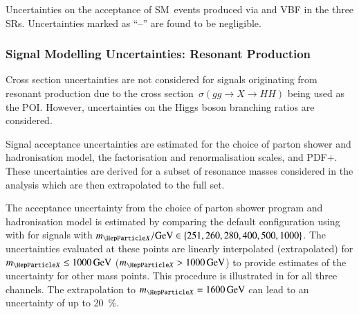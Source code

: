 \begin{table}[htbp]
  \centering

  \caption{Uncertainties on the acceptance of SM~\HH events produced via \ggF
    and VBF in the three SRs. Uncertainties marked as ``--'' are found to be
    negligible.}%
  \label{tab:theory_uncertainty_signal}

  
\end{table}


\subsubsection{Signal Modelling Uncertainties: Resonant \HH Production}

Cross section uncertainties are not considered for signals originating from
resonant \HH production due to the cross section~$\sigma(gg \to X \to HH)$ being
used as the POI. However, uncertainties on the Higgs boson branching ratios are
considered.

Signal acceptance uncertainties are estimated for the choice of parton shower
and hadronisation model, the factorisation and renormalisation scales, and
PDF+\alphas. These uncertainties are derived for a subset of resonance masses
considered in the analysis
which are then extrapolated to the full set.

The acceptance uncertainty from the choice of parton shower program and
hadronisation model is estimated by comparing the default configuration using
\HERWIG[7] with \PYTHIA[8] for signals with
\mbox{$\mX / \si{\GeV} \in \left\{ 251, 260, 280, 400, 500, 1000 \right\}$}.
The uncertainties evaluated at these points are linearly interpolated
(extrapolated) for $\mX \leq \SI{1000}{\GeV}$ ($\mX > \SI{1000}{\GeV}$) to
provide estimates of the uncertainty for other mass points. This procedure is
illustrated in  for all three channels. The
extrapolation to $\mX = \SI{1600}{\GeV}$ can lead to an uncertainty of up to
\SI{20}{\percent}.

